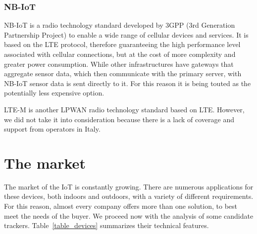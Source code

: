 \subsubsection{NB-IoT}
NB-IoT is a radio technology standard developed by 3GPP (3rd Generation Partnership Project) to enable a wide range of cellular devices and services. It is based on the LTE protocol, therefore guaranteeing the high performance level associated with cellular connections, but at the cost of more complexity and greater power consumption. While other infrastructures have gateways that aggregate sensor data, which then communicate with the primary server, with NB-IoT sensor data is sent directly to it. For this reason it is being touted as the potentially less expensive option.

LTE-M is another LPWAN radio technology standard based on LTE. However, we did not take it into consideration because there is a lack of coverage and support from operators in Italy.



\section{The market}
\label{sec:market}

The market of the IoT is constantly growing. There are numerous applications for these devices, both indoors and outdoors, with a variety of different requirements. For this reason, almost every company offers more than one solution, to best meet the needs of the buyer. We proceed now with the analysis of some candidate trackers. Table~\ref{table_devices} summarizes their technical features.

